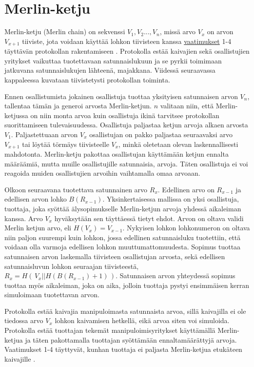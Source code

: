\section{Merlin-ketju }

Merlin-ketju (Merlin chain) on sekvenssi $V_1, V_2 ... , V_n$, missä arvo $V_x$ on arvon $V_{x+1}$ tiiviste, jota voidaan käyttää lohkon tiivisteen kanssa \hyperref[vaatimukset]{vaatimukset} 1-4 täyttävän protokollan rakentamiseen \cite{MerlinChains}. Protokolla estää kaivajien sekä osallistujien yritykset vaikuttaa tuotettavaan satunnaislukuun ja se pyrkii toimimaan jatkuvana satunnaislukujen lähteenä, majakkana. Viidessä seuraavassa kappaleessa kuvataan tiivistetysti protokollan toiminta.

Ennen osallistumista jokainen osallistuja tuottaa yksityisen satunnaisen arvon $V_n$, tallentaa tämän ja generoi arvosta Merlin-ketjun. $n$ valitaan niin, että Merlin-ketjussa on niin monta arvoa kuin osallistuja ikinä tarvitsee protokollan suorittamiseen tulevaisuudessa. Osallistuja paljastaa ketjun arvoja alkaen arvosta $V_1$. Paljastettuaan arvon $V_x$ osallistujan on pakko paljastaa seuraavaksi arvo $V_{x+1}$ tai löytää törmäys tiivisteelle $V_x$, minkä oletetaan olevan laskennallisesti mahdotonta. Merlin-ketju pakottaa osallistujan käyttämään ketjun ennalta määräämiä, mutta muille osallistujille satunnaisia, arvoja. Täten osallistuja ei voi reagoida muiden osallistujien arvoihin vaihtamalla omaa arvoaan.  

Olkoon seuraavana tuotettava satunnainen arvo $R_x$. Edellinen arvo on $R_{x-1}$ ja edellisen arvon lohko $B(R_{x-1})$.
Yksinkertaisessa mallissa on yksi osallistuja, tuottaja, joka syöttää älysopimukselle Merlin-ketjun arvoja yhdessä aikaleiman kanssa. Arvo $V_{x}$ hyväksytään sen täyttäessä tietyt ehdot. Arvon on oltava validi Merlin ketjun arvo, eli $H(V_{x}) = V_{x-1}$. Nykyisen lohkon lohkonumeron on oltava niin paljon suurempi kuin lohkon, jossa edellinen satunnaisluku tuotettiin, että voidaan olla varmoja edellisen lohkon muuttumattomuudesta. Sopimus tuottaa satunnaisen arvon laskemalla tiivisteen osallistujan arvosta, sekä edellisen satunnaisluvun lohkon seuraajan tiivisteestä, $R_x = H(\, V_x || H(B(R_{x-1})+1) \,)$. Satunnaisen arvon yhteydessä sopimus tuottaa myös aikaleiman, joka on aika, jolloin tuottaja pystyi ensimmäisen kerran simuloimaan tuotettavan arvon. 

Protokolla estää kaivajia manipuloimasta satunnaista arvoa, sillä kaivajilla ei ole tiedossa arvo $V_x$ lohkon kaivamisen hetkellä, eikä arvoa siten voi simuloida. Protokolla estää tuottajan tekemät manipuloimisyritykset käyttämällä Merlin-ketjua ja täten pakottamalla tuottajan syöttämään ennaltamäärättyjä arvoja. Vaatimukset 1-4 täyttyvät, kunhan tuottaja ei paljasta Merlin-ketjua etukäteen kaivajille \cite{MerlinChains}. 


